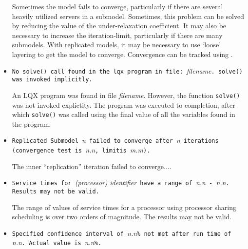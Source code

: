 \begin{itemize}
  Sometimes the model fails to converge,
  particularly if there are several heavily utilized
  servers in a submodel.  Sometimes, this
  problem can be solved by reducing the value of the
  under-relaxation coefficient.  It may also
  be necessary to increase the iteration-limit,
  particularly if there are many submodels.  With replicated
  models, it may be necessary to use
  `loose' layering to get the model to converge.
  Convergence can be tracked using .

\item \texttt{No solve() call found in the lqx program in file: }\emph{filename}\texttt{.  solve() was
    invoked implicitly.}
  
  An LQX program was found in file \emph{filename}.  However, the function
  \texttt{solve()} was not invoked explictity.  The program was executed to
  completion, after which \texttt{solve()} was called using the final value of all the variables found in
  the program.
  
\item \texttt{Replicated Submodel }\emph{n}\texttt{ failed to converge
    after }\emph{n}\texttt{ iterations (convergence test is
  }\emph{n.n}\texttt{, limit}\linebreak[4] \texttt{is }\emph{m.m}\texttt{).}
  
  The inner ``replication''
  iteration failed to
  converge....

\item \texttt{Service times for }\emph{(processor)}
  \emph{identifier}\texttt{ have a range of }\emph{n.n}\texttt{ -
  }\emph{n.n}\texttt{. Results may not be valid.}
  
  The range of values of service times for a
  processor using processor sharing
  scheduling is over two orders of
  magnitude.  The results may not be valid.

\item \texttt{Specified confidence interval of }\emph{n.n}\texttt{\%
    not met after run time of }\emph{n.n}\texttt{. Actual value is
  }\emph{n.n}\texttt{\%.}


\end{itemize}
